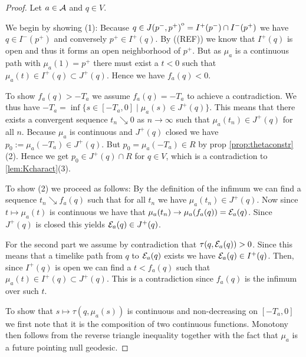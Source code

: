 \begin{proof}
Let $a\in {\mathcal{A}}$ and $q\in V$.

We begin by showing (1): 
Because $q \in {\kern0ptJ(p^-,p^+)}^{\mathrm{o}} = I^+(p^-)\cap I^-(p^+)$ we have $q\in I^-(p^+)$ and conversely $p^+\in I^+(q)$. By ((REF)) we know that $I^+(q)$ is open and thus it forms an open neighborhood of $p^+$. But as $\mu_a$ is a continuous path with $\mu_a(1)=p^+$ there must exist a $t<0$ such that $\mu_a(t)\in I^+(q)\subset J^+(q)$. Hence we have $f_a(q)<0$.

To show $f_a(q)>-T_a$ we assume $f_a(q)=-T_a$ to achieve a contradiction. We thus have $-T_a=\inf \{s\in [-T_a,0] \mid \mu_a(s)\in J^+(q)\}$. This means that there exists a convergent sequence $t_n\searrow 0$ as $n\to \infty$ such that $\mu_a(t_n)\in J^+(q)$ for all $n$. Because $\mu_a$ is continuous and $J^+(q)$ closed we have $p_0:=\mu_a(-T_a)\in J^+(q)$. But $p_0=\mu_a(-T_a)\in R$ by prop \ref{prop:thetaconstr}(2). Hence we get $p_0\in J^+(q) \cap R$ for $q\in V$, which is a contradiction to \ref{lem:Kcharact}(3).

To show (2) we proceed as follows:
By the definition of the infimum we can find a sequence $t_n\searrow f_a(q)$ such that for all $t_n$ we have $\mu_a(t_n)\in J^+(q)$. Now since $t\mapsto \mu_a(t)$ is continuous we have that $\mu_a(t_n)\to \mu_a(f_a(q)) = {\mathcal{E}}_a(q)$. Since $J^+(q)$ is closed this yields ${\mathcal{E}}_a(q)\in J^+(q)$. 

For the second part we assume by contradiction that $\tau(q,{\mathcal{E}}_a(q)) > 0$. Since this means that a timelike path from $q$ to ${\mathcal{E}}_a(q)$ exists we have ${\mathcal{E}}_a(q)\in I^+(q)$. Then, since $I^+(q)$ is open we can find a $t<f_a(q)$ such that $\mu_a(t)\in I^+(q) \subset J^+(q)$. This is a contradiction since $f_a(q)$ is the infimum over such $t$.

To show that $s\mapsto \tau(q,\mu_a(s))$ is continuous and non-decreasing on $[-T_a,0]$ we first note that it is the composition of two continuous functions. Monotony then follows from the reverse triangle inequality together with the fact that $\mu_a$ is a future pointing null geodesic.


\end{proof}

